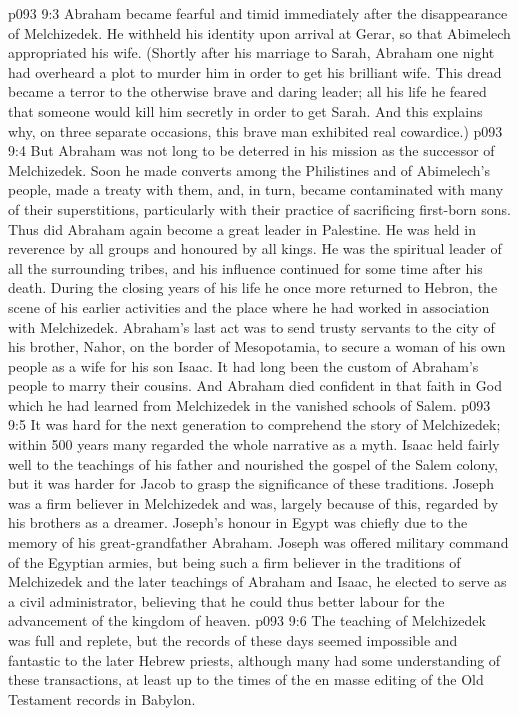 \vs p093 9:3 Abraham became fearful and timid immediately after the disappearance of Melchizedek. He withheld his identity upon arrival at Gerar, so that Abimelech appropriated his wife. (Shortly after his marriage to Sarah, Abraham one night had overheard a plot to murder him in order to get his brilliant wife. This dread became a terror to the otherwise brave and daring leader; all his life he feared that someone would kill him secretly in order to get Sarah. And this explains why, on three separate occasions, this brave man exhibited real cowardice.)
\vs p093 9:4 But Abraham was not long to be deterred in his mission as the successor of Melchizedek. Soon he made converts among the Philistines and of Abimelech’s people, made a treaty with them, and, in turn, became contaminated with many of their superstitions, particularly with their practice of sacrificing first\hyp{}born sons. Thus did Abraham again become a great leader in Palestine. He was held in reverence by all groups and honoured by all kings. He was the spiritual leader of all the surrounding tribes, and his influence continued for some time after his death. During the closing years of his life he once more returned to Hebron, the scene of his earlier activities and the place where he had worked in association with Melchizedek. Abraham’s last act was to send trusty servants to the city of his brother, Nahor, on the border of Mesopotamia, to secure a woman of his own people as a wife for his son Isaac. It had long been the custom of Abraham’s people to marry their cousins. And Abraham died confident in that faith in God which he had learned from Melchizedek in the vanished schools of Salem.
\vs p093 9:5 \pc It was hard for the next generation to comprehend the story of Melchizedek; within 500 years many regarded the whole narrative as a myth. Isaac held fairly well to the teachings of his father and nourished the gospel of the Salem colony, but it was harder for Jacob to grasp the significance of these traditions. Joseph was a firm believer in Melchizedek and was, largely because of this, regarded by his brothers as a dreamer. Joseph’s honour in Egypt was chiefly due to the memory of his great\hyp{}grandfather Abraham. Joseph was offered military command of the Egyptian armies, but being such a firm believer in the traditions of Melchizedek and the later teachings of Abraham and Isaac, he elected to serve as a civil administrator, believing that he could thus better labour for the advancement of the kingdom of heaven.
\vs p093 9:6 The teaching of Melchizedek was full and replete, but the records of these days seemed impossible and fantastic to the later Hebrew priests, although many had some understanding of these transactions, at least up to the times of the en masse editing of the Old Testament records in Babylon.
